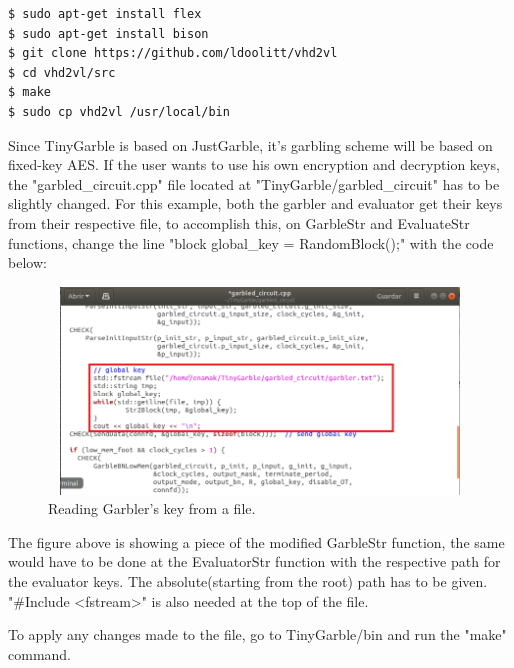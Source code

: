 \begin{refsection}
\begin{lstlisting}[caption={Installation of VHD2VL}, language=bash, captionpos=b]                                                                                                                                                                                  
$ sudo apt-get install flex                                                                                                                                                                         
$ sudo apt-get install bison
$ git clone https://github.com/ldoolitt/vhd2vl
$ cd vhd2vl/src
$ make
$ sudo cp vhd2vl /usr/local/bin
\end{lstlisting}

Since TinyGarble is based on JustGarble, it's garbling scheme will be based on fixed-key AES. If the user wants to use his own encryption and decryption keys, the "garbled\_circuit.cpp" file located at "TinyGarble/garbled\_circuit" has to be slightly changed. For this example, both the garbler and evaluator get their keys from their respective file, to accomplish this, on GarbleStr and EvaluateStr functions, change the line "block global\_key =  RandomBlock();" with the code below:

\begin{figure}[H]
	\centering
	\includegraphics[width=1\textwidth, height=5.5cm]{./sdf/secure_multiparty_computation/figures/key_file.png}
    \caption{Reading Garbler's key from a file.}\label{fig:key_file}
\end{figure}

The figure above is showing a piece of the modified GarbleStr function, the same would have to be done at the EvaluatorStr function with the respective path for the evaluator keys. The absolute(starting from the root) path has to be given. "\#Include <fstream>" is also needed at the top of the file.

To apply any changes made to the file, go to TinyGarble/bin and run the "make" command.


\end{refsection}
